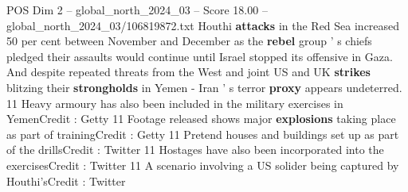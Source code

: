 \begin{textsample}{POS Dim 2 – global\_north\_2024\_03 – Score 18.00 – global\_north\_2024\_03/106819872.txt}
Houthi \textbf{attacks} in the Red Sea increased 50 per cent between November and December as the \textbf{rebel} group ' s chiefs pledged their assaults would continue until Israel stopped its offensive in Gaza.
And despite repeated threats from the West and joint US and UK \textbf{strikes} blitzing their \textbf{strongholds} in Yemen - Iran ' s terror \textbf{proxy} appears undeterred. 11 Heavy armoury has also been included in the military exercises in YemenCredit : Getty 11 Footage released shows major \textbf{explosions} taking place as part of trainingCredit : Getty 11 Pretend houses and buildings set up as part of the drillsCredit : Twitter 11 Hostages have also been incorporated into the exercisesCredit : Twitter 11 A scenario involving a US solider being captured by Houthi'sCredit : Twitter

\end{textsample}
